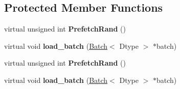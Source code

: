 \subsection*{Protected Member Functions}
\begin{DoxyCompactItemize}
\item 
\mbox{\label{classcaffe_1_1_window_data_layer_a7099d57c81d9cfe38837709b47106aa4}} 
virtual unsigned int {\bfseries Prefetch\+Rand} ()
\item 
\mbox{\label{classcaffe_1_1_window_data_layer_a2ed13370d4ba85e0968b4efc69530720}} 
virtual void {\bfseries load\+\_\+batch} (\mbox{\hyperlink{classcaffe_1_1_batch}{Batch}}$<$ Dtype $>$ $\ast$batch)
\item 
\mbox{\label{classcaffe_1_1_window_data_layer_a7099d57c81d9cfe38837709b47106aa4}} 
virtual unsigned int {\bfseries Prefetch\+Rand} ()
\item 
\mbox{\label{classcaffe_1_1_window_data_layer_a2ed13370d4ba85e0968b4efc69530720}} 
virtual void {\bfseries load\+\_\+batch} (\mbox{\hyperlink{classcaffe_1_1_batch}{Batch}}$<$ Dtype $>$ $\ast$batch)
\end{DoxyCompactItemize}
